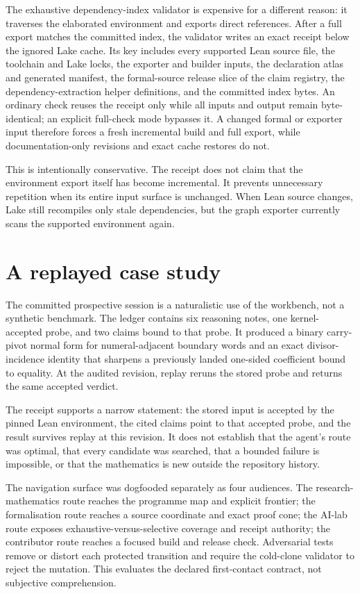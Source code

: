 \documentclass[11pt]{article}
\begin{document}
The exhaustive dependency-index validator is expensive for a different
reason: it traverses the elaborated environment and exports direct
references. After a full export matches the committed index, the validator
writes an exact receipt below the ignored Lake cache. Its key includes every
supported Lean source file, the toolchain and Lake locks, the exporter and
builder inputs, the declaration atlas and generated manifest, the formal-source
release slice of the claim registry, the dependency-extraction helper
definitions, and the committed index bytes. An ordinary check reuses the receipt
only while all inputs and output
remain byte-identical; an explicit full-check mode bypasses it. A changed
formal or exporter input therefore forces a fresh incremental build and full
export, while documentation-only revisions and exact cache restores do not.

This is intentionally conservative. The receipt does not claim that the
environment export itself has become incremental. It prevents unnecessary
repetition when its entire input surface is unchanged. When Lean source
changes, Lake still recompiles only stale dependencies, but the graph exporter
currently scans the supported environment again.

\section{A replayed case study}\label{sec:dogfood}

The committed prospective session is a naturalistic use of the workbench, not
a synthetic benchmark. The ledger contains six reasoning notes, one
kernel-accepted probe, and two claims bound to that probe. It produced a binary
carry-pivot normal form for numeral-adjacent boundary words and an exact
divisor-incidence identity that sharpens a previously landed one-sided
coefficient bound to equality. At the audited revision, replay reruns the
stored probe and returns the same accepted verdict.

The receipt supports a narrow statement: the stored input is accepted by the
pinned Lean environment, the cited claims point to that accepted probe, and
the result survives replay at this revision. It does not establish that the
agent's route was optimal, that every candidate was searched, that a bounded
failure is impossible, or that the mathematics is new outside the repository
history.

The navigation surface was dogfooded separately as four audiences. The
research-mathematics route reaches the programme map and explicit frontier;
the formalisation route reaches a source coordinate and exact proof cone; the
AI-lab route exposes exhaustive-versus-selective coverage and receipt
authority; the contributor route reaches a focused build and release check.
Adversarial tests remove or distort each protected transition and require the
cold-clone validator to reject the mutation. This evaluates the declared
first-contact contract, not subjective comprehension.
\end{document}
